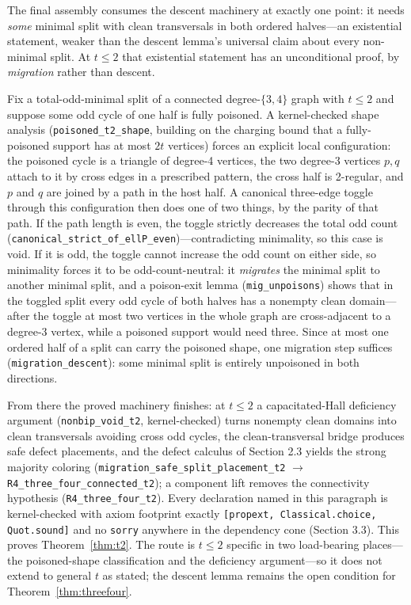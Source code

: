 \documentclass[11pt]{article}
\theoremstyle{definition}
\theoremstyle{remark}
\begin{document}
The final assembly consumes the descent machinery at exactly one point: it needs \emph{some} minimal split with clean transversals in both ordered halves---an existential statement, weaker than the descent lemma's universal claim about every non-minimal split. At $t \le 2$ that existential statement has an unconditional proof, by \emph{migration} rather than descent.

Fix a total-odd-minimal split of a connected degree-$\{3,4\}$ graph with $t \le 2$ and suppose some odd cycle of one half is fully poisoned. A kernel-checked shape analysis (\texttt{poisoned\_t2\_shape}, building on the charging bound that a fully-poisoned support has at most $2t$ vertices) forces an explicit local configuration: the poisoned cycle is a triangle of degree-4 vertices, the two degree-3 vertices $p, q$ attach to it by cross edges in a prescribed pattern, the cross half is 2-regular, and $p$ and $q$ are joined by a path in the host half. A canonical three-edge toggle through this configuration then does one of two things, by the parity of that path. If the path length is even, the toggle strictly decreases the total odd count (\texttt{canonical\_strict\_of\_ellP\_even})---contradicting minimality, so this case is void. If it is odd, the toggle cannot increase the odd count on either side, so minimality forces it to be odd-count-neutral: it \emph{migrates} the minimal split to another minimal split, and a poison-exit lemma (\texttt{mig\_unpoisons}) shows that in the toggled split every odd cycle of both halves has a nonempty clean domain---after the toggle at most two vertices in the whole graph are cross-adjacent to a degree-3 vertex, while a poisoned support would need three. Since at most one ordered half of a split can carry the poisoned shape, one migration step suffices (\texttt{migration\_descent}): some minimal split is entirely unpoisoned in both directions.

From there the proved machinery finishes: at $t \le 2$ a capacitated-Hall deficiency argument (\texttt{nonbip\_void\_t2}, kernel-checked) turns nonempty clean domains into clean transversals avoiding cross odd cycles, the clean-transversal bridge produces safe defect placements, and the defect calculus of Section 2.3 yields the strong majority coloring (\texttt{migration\_safe\_split\_placement\_t2} $\to$ \texttt{R4\_three\_four\_connected\_t2}); a component lift removes the connectivity hypothesis (\texttt{R4\_three\_four\_t2}). Every declaration named in this paragraph is kernel-checked with axiom footprint exactly \texttt{[propext, Classical.choice, Quot.sound]} and no \texttt{sorry} anywhere in the dependency cone (Section 3.3). This proves Theorem~\ref{thm:t2}. The route is $t \le 2$ specific in two load-bearing places---the poisoned-shape classification and the deficiency argument---so it does not extend to general $t$ as stated; the descent lemma remains the open condition for Theorem~\ref{thm:threefour}.
\end{document}

